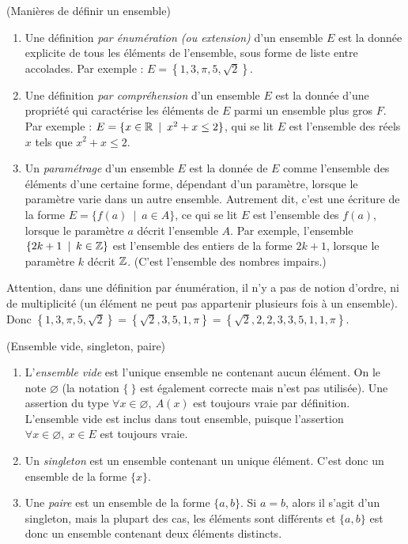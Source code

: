 \begin{definition}(Manières de définir un ensemble)

\begin{enumerate}
\item Une définition \emph{par énumération (ou extension)} d'un ensemble $E$ est la donnée explicite de tous les éléments de l'ensemble, sous forme de liste entre accolades. Par exemple : $E = \left\{1,3,\pi,5,\sqrt2\right\}$.
\item Une définition \emph{par compréhension} d'un ensemble $E$ est la donnée d'une propriété qui caractérise les éléments de $E$ parmi un ensemble plus gros $F$. Par exemple : $E = \{x\in \R\:\mid\: x^2+x\leq 2\}$, qui se lit \og$E$ est l'ensemble des réels $x$ tels que $x^2+x\leq 2$\fg.
\item Un \emph{paramétrage} d'un ensemble $E$ est la donnée de $E$ comme l'ensemble des éléments d'une certaine forme, dépendant d'un paramètre, lorsque le paramètre varie dans un autre ensemble. Autrement dit, c'est une écriture de la forme $E = \{f(a)\:\mid\: a\in A\}$, ce qui se lit \og $E$ est l'ensemble des $f(a)$, lorsque le paramètre $a$ décrit l'ensemble $A$\fg. Par exemple, l'ensemble $\{2k+1\:\mid\: k\in \Z\}$ est l'ensemble des entiers de la forme $2k+1$, lorsque le paramètre $k$ décrit $\mathbb{Z}$. (C'est l'ensemble des nombres impairs.)
\end{enumerate}
\end{definition}



Attention, dans une définition par énumération, il n'y a pas de notion d'ordre, ni de multiplicité (un élément ne peut pas appartenir \og plusieurs fois\fg{} à un ensemble). Donc  $\left\{1,3,\pi,5,\sqrt2\right\} = \left\{\sqrt 2, 3,5,1,\pi\right\}=\left\{\sqrt 2,2, 2, 3,  3,5,1,1,\pi\right\}$.

\begin{definition}(Ensemble vide, singleton, paire)
\begin{enumerate}
\item L'\emph{ensemble vide} est l'unique ensemble ne contenant aucun élément. On le note $\varnothing$ (la notation $\{\:\}$ est également correcte mais n'est pas utilisée). Une assertion du type \og $\forall x\in \varnothing, \: A(x)$\fg{} est toujours vraie par définition. L'ensemble vide est inclus dans tout ensemble, puisque l'assertion \og $\forall x\in \varnothing, \: x\in E$\fg{} est toujours vraie.
\item Un \emph{singleton} est un ensemble contenant un unique élément. C'est donc un ensemble de la forme $\{x\}$.
\item Une \emph{paire} est un ensemble de la forme $\{a,b\}$. Si $a=b$, alors il s'agit d'un singleton, mais la plupart des cas, les éléments sont différents et $\{a,b\}$ est donc un ensemble contenant deux éléments distincts.
\end{enumerate}
\end{definition}

